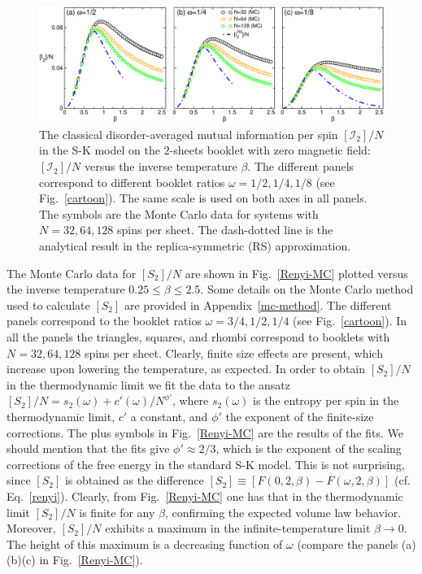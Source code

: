 \documentclass[twocolumn,superscriptaddress,prb,10pt]{revtex4-1}
\begin{document}
\begin{figure}[t]
\includegraphics*[width=0.93\linewidth]{./draft_figs/I2_MC_v1}
\caption{The classical disorder-averaged mutual information per spin $[{\mathcal I}_2]/N$ 
 in the S-K model on the $2$-sheets booklet with zero magnetic field: 
 $[{\mathcal I}_2]/N$ versus the inverse temperature $\beta$. The 
 different panels correspond to different booklet ratios $\omega=1/2,1/4,1/8$ 
 (see Fig.~\ref{cartoon}). The same scale is used on both axes in all 
 panels. The symbols are the Monte Carlo data 
 for systems with $N=32,64,128$ spins per sheet. The dash-dotted line is 
 the analytical result in the replica-symmetric (RS) approximation.  
}
\label{I2-MC}
\end{figure}

The Monte Carlo data for $[S_2]/N$  are shown in Fig.~\ref{Renyi-MC} plotted versus the 
inverse temperature $0.25\le\beta\le 2.5$. Some details on the Monte Carlo method used 
to calculate $[S_2]$ are provided in Appendix~\ref{mc-method}. The different panels 
correspond to the booklet ratios $\omega=3/4,1/2,1/4$ (see Fig.~\ref{cartoon}). In all the 
panels the triangles, squares, and rhombi correspond to booklets with $N=32,64,128$ spins 
per sheet. Clearly, finite size effects are present, which increase upon lowering 
the temperature, as expected. In order to obtain $[S_2]/N$ in the thermodynamic limit 
we fit the data to the ansatz $[S_2]/N=s_2(\omega)+c'(\omega)/N^{\phi'}$, where 
$s_2(\omega)$ is the entropy per spin in the thermodynamic limit, $c'$ a constant, and 
$\phi'$ the exponent of the finite-size corrections. The plus symbols in Fig.~\ref{Renyi-MC} 
are the results of the fits. We should mention that the fits give $\phi'\approx 2/3$, 
which is the exponent of the scaling corrections of the free energy in the standard 
S-K model. This is not surprising, since $[S_2]$ is obtained as the difference 
$[S_2]\equiv [F(0,2,\beta)-F(\omega,2,\beta)]$ (cf. Eq.~\eqref{renyi}). 
Clearly, from Fig.~\ref{Renyi-MC} one has that in the thermodynamic limit $[S_2]/N$ is 
finite for any $\beta$, confirming the expected volume law behavior. Moreover, $[S_2]/N$ 
exhibits a maximum in the infinite-temperature limit $\beta\to0$. The height of this 
maximum  is a decreasing function of $\omega$ (compare the panels (a)(b)(c) in 
Fig.~\ref{Renyi-MC}). 
\end{document}
